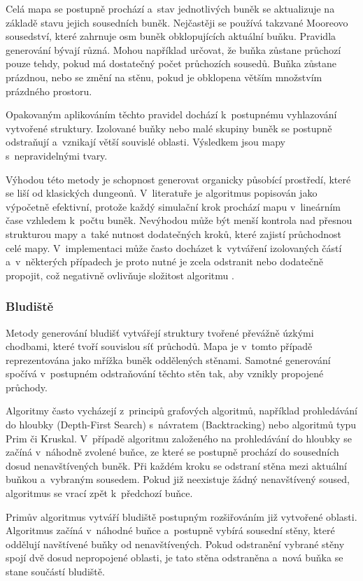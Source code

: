 \documentclass[
   program=itk,
   biblatex,
   figures=true,
   tables=true,
   glossaries,
   index
]{kidiplom}
\begin{document}
Celá mapa se postupně prochází a~stav jednotlivých buněk se aktualizuje na základě stavu jejich sousedních buněk. Nejčastěji se používá takzvané Mooreovo sousedství, které zahrnuje osm buněk obklopujících aktuální buňku. Pravidla generování bývají různá. Mohou například určovat, že buňka zůstane průchozí pouze tehdy, pokud má dostatečný počet průchozích sousedů. Buňka zůstane prázdnou, nebo se změní na stěnu, pokud je obklopena větším množstvím prázdného prostoru.

Opakovaným aplikováním těchto pravidel dochází k~postupnému vyhlazování vytvořené struktury. Izolované buňky nebo malé skupiny buněk se postupně odstraňují a~vznikají větší souvislé oblasti. Výsledkem jsou mapy s~nepravidelnými tvary.

Výhodou této metody je schopnost generovat organicky působící prostředí, které se liší od klasických dungeonů. V~literatuře je algoritmus popisován jako výpočetně efektivní, protože každý simulační krok prochází mapu v~lineárním čase vzhledem k~počtu buněk. Nevýhodou může být menší kontrola nad přesnou strukturou mapy a~také nutnost dodatečných kroků, které zajistí průchodnost celé mapy. V~implementaci může často docházet k~vytváření izolovaných částí a~v~některých případech je proto nutné je zcela odstranit nebo dodatečně propojit, což negativně ovlivňuje složitost algoritmu \cite{Linden2014,Shaker2016}.

\subsubsection{Bludiště}

Metody generování bludišť vytvářejí struktury tvořené převážně úzkými chodbami, které tvoří souvislou síť průchodů. Mapa je v~tomto případě reprezentována jako mřížka buněk oddělených stěnami. Samotné generování spočívá v~postupném odstraňování těchto stěn tak, aby vznikly propojené průchody.

Algoritmy často vycházejí z~principů grafových algoritmů, například prohledávání do hloubky (Depth-First Search) s~návratem (Backtracking) nebo algoritmů typu Prim či Kruskal. V~případě algoritmu založeného na prohledávání do hloubky se začíná v~náhodně zvolené buňce, ze které se postupně prochází do sousedních dosud nenavštívených buněk. Při každém kroku se odstraní stěna mezi aktuální buňkou a~vybraným sousedem. Pokud již neexistuje žádný nenavštívený soused, algoritmus se vrací zpět k~předchozí buňce.

Primův algoritmus vytváří bludiště postupným rozšiřováním již vytvořené oblasti. Algoritmus začíná v~náhodné buňce a~postupně vybírá sousední stěny, které oddělují navštívené buňky od nenavštívených. Pokud odstranění vybrané stěny spojí dvě dosud nepropojené oblasti, je tato stěna odstraněna a~nová buňka se stane součástí bludiště.
\end{document}
